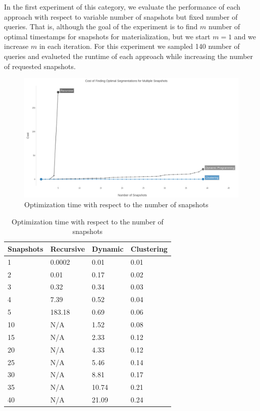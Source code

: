 			In the first experiment of this category, we evaluate the performance of each approach with respect to variable number of snapshots but fixed number of queries. That is, although the goal of the experiment is to find $m$ number of optimal timestamps for snapshots for materialization, but we start $m=1$ and we increase $m$ in each iteration. For this experiment we sampled 140 number of queries and evalueted the runtime of each approach while increasing the number of requested snapshots.

			\begin{figure}
				\centering
				\includegraphics[width=\textwidth]{figs/variable_snapshots.jpg}
				\caption{Optimization time with respect to the number of snapshots}
				\label{fig:variable_snapshots}
			\end{figure} 

			\begin {center}
			\begin{table}
				\centering
				\caption{Optimization time with respect to the number of snapshots}
				\label {table:variable_snapshots}
				\begin{tabular}{p{2cm}p{3cm}p{3cm}p{3cm}}
					\hline
					Snapshots & Recursive      & Dynamic  & Clustering \\ \hline
					1 & 0.0002    & 0.01  & 0.01  \\  
					2 & 0.01    & 0.17  & 0.02  \\
					3 & 0.32    & 0.34  & 0.03  \\
					4 & 7.39 & 0.52  & 0.04  \\
					5 & 183.18 & 0.69  & 0.06 \\
					10 & N/A    & 1.52  & 0.08  \\
					15 & N/A & 2.33  & 0.12  \\ 
					20 & N/A & 4.33  & 0.12  \\ 
					25 & N/A & 5.46  & 0.14  \\ 
					30 & N/A & 8.81  & 0.17  \\
					35 & N/A & 10.74  & 0.21  \\
					40 & N/A & 21.09  & 0.24  \\\hline
				\end{tabular}
			\end{table}
			\end{center}

